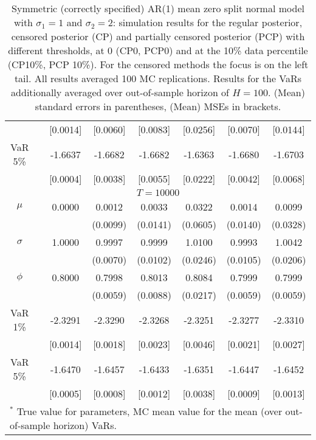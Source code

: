 {{\begin{table}
\begin{tabular}{cc cccccc}
  && [0.0014] & [0.0060] & [0.0083] & [0.0256] & [0.0070] & [0.0144] \\ 
\rowcolor{LightCyan} VaR 5\% && -1.6637 & -1.6682 & -1.6682 & -1.6363 & -1.6680 & -1.6703 \\ 
 && [0.0004] & [0.0038] & [0.0055] & [0.0222] & [0.0042] & [0.0068] \\ 
\hline 
\multicolumn{8}{c}{$T =10000$}  \\ 
\hline 
\rowcolor{LightCyan} $\mu$&& 0.0000 & 0.0012 & 0.0033 & 0.0322 & 0.0014 & 0.0099 \\ 
&&   & (0.0099) & (0.0141) & (0.0605) & (0.0140) & (0.0328) \\ 
\rowcolor{LightCyan} $\sigma$&& 1.0000 & 0.9997 & 0.9999 & 1.0100 & 0.9993 & 1.0042 \\ 
&&   & (0.0070) & (0.0102) & (0.0246) & (0.0105) & (0.0206) \\ 
\rowcolor{LightCyan} $\phi$&& 0.8000 & 0.7998 & 0.8013 & 0.8084 & 0.7999 & 0.7999 \\ 
&&   & (0.0059) & (0.0088) & (0.0217) & (0.0059) & (0.0059) \\ 
\rowcolor{LightCyan} VaR 1\% && -2.3291 & -2.3290 & -2.3268 & -2.3251 & -2.3277 & -2.3310 \\ 
  && [0.0014] & [0.0018] & [0.0023] & [0.0046] & [0.0021] & [0.0027] \\ 
\rowcolor{LightCyan} VaR 5\% && -1.6470 & -1.6457 & -1.6433 & -1.6351 & -1.6447 & -1.6452 \\ 
 && [0.0005] & [0.0008] & [0.0012] & [0.0038] & [0.0009] & [0.0013] \\ 
\hline 
\multicolumn{8}{l}{\footnotesize{$^*$ True value for parameters, MC mean value for the mean (over out-of-sample horizon) VaRs.}}  \\ 
\end{tabular}
 \caption{Symmetric (correctly specified) AR(1) mean zero split normal model with $\sigma_{1}=1$ and $\sigma_{2}=2$: simulation results   for the regular posterior, censored posterior (CP) and partially censored posterior (PCP) with different thresholds, at $0$ (CP0, PCP0) and at the 10\% data percentile (CP10\%, PCP 10\%). For the censored methods the focus is on the left tail. All results averaged 100 MC replications. Results for the VaRs additionally averaged over out-of-sample horizon of $H=100$. (Mean) standard errors in parentheses, (Mean) MSEs in brackets.} 
\label{tab:ar1_pcp_s1}  
\end{table}
}
}